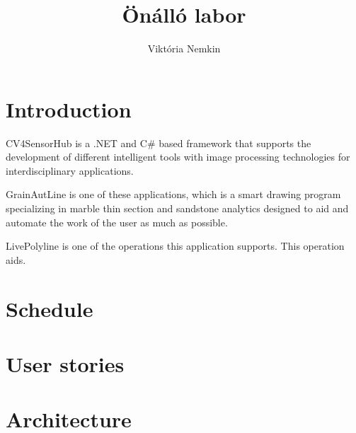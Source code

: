 \documentclass[11pt,oneside]{article}
\author{Viktória Nemkin}
\title{Önálló labor}
\begin{document}
\maketitle
\newpage
\tableofcontents
\newpage

\section{Introduction}

CV4SensorHub is a .NET and C# based framework that supports the development of different intelligent tools with image processing technologies for interdisciplinary applications.

GrainAutLine is one of these applications, which is a smart drawing program specializing in marble thin section and sandstone analytics designed to aid and automate the work of the user as much as possible.

LivePolyline is one of the operations this application supports. This operation aids.

\section{Schedule}


\section{User stories}


\section{Architecture}
\end{document}
